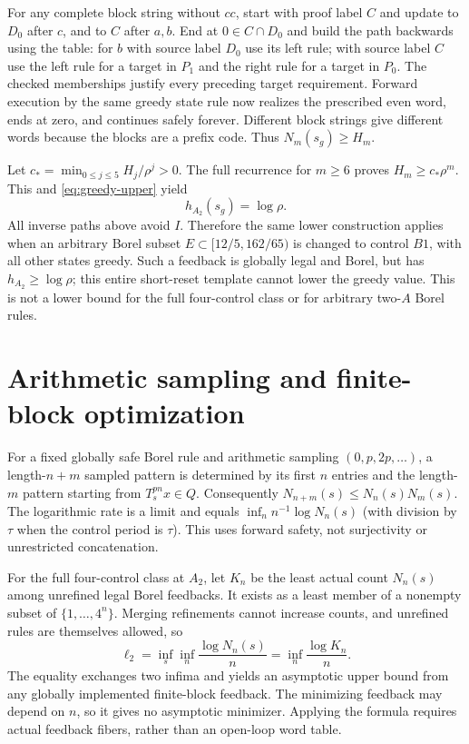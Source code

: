 \documentclass[11pt,reqno]{amsart}
\numberwithin{equation}{section}
\theoremstyle{definition}
\begin{document}
For any complete block string without $cc$, start with proof label
$C$ and update to $D_0$ after $c$, and to $C$ after $a,b$.
End at $0\in C\cap D_0$ and build the path backwards using
the table: for $b$ with source label $D_0$ use its left rule;
with source label $C$ use the left rule for a target in $P_1$
and the right rule for a target in $P_0$. The checked memberships
justify every preceding target requirement. Forward execution by
the same greedy state rule now realizes the prescribed even word,
ends at zero, and continues safely forever. Different block strings
give different words because the blocks are a prefix code. Thus
$N_m(s_g)\ge H_m$.

Let $c_* =\min_{0\le j\le5}H_j/\rho^j>0$. The full recurrence
for $m\ge6$ proves $H_m\ge c_*\rho^m$. This and
\eqref{eq:greedy-upper} yield
\begin{equation}\label{eq:greedy-exact}
 h_{A_2}(s_g)=\log\rho.
\end{equation}
All inverse paths above avoid $I$. Therefore the same lower
construction applies when an arbitrary Borel subset
$E\subset[12/5,162/65)$ is changed to control $B1$, with all
other states greedy. Such a feedback is globally legal and Borel,
but has $h_{A_2}\ge\log\rho$; this entire short-reset template
cannot lower the greedy value. This is not a lower bound for the
full four-control class or for arbitrary two-$A$ Borel rules.

\section{Arithmetic sampling and finite-block optimization}
\label{app:finiteblock}
For a fixed globally safe Borel rule and arithmetic sampling
$(0,p,2p,\ldots)$, a length-$n+m$ sampled pattern is determined
by its first $n$ entries and the length-$m$ pattern starting from
$T_s^{pn}x\in Q$. Consequently $N_{n+m}(s)\le N_n(s)N_m(s)$.
The logarithmic rate is a limit and equals
$\inf_n n^{-1}\log N_n(s)$ (with division by $\tau$ when
the control period is $\tau$). This uses forward safety, not
surjectivity or unrestricted concatenation.

For the full four-control class at $A_2$, let $K_n$ be the least
actual count $N_n(s)$ among unrefined legal Borel feedbacks.
It exists as a least member of a nonempty subset of
$\{1,\ldots,4^n\}$. Merging refinements cannot increase counts,
and unrefined rules are themselves allowed, so
\begin{equation}\label{eq:finiteblock}
 \ell_2=\inf_s\inf_n\frac{\log N_n(s)}n
 =\inf_n\frac{\log K_n}n.
\end{equation}
The equality exchanges two infima and yields an asymptotic upper
bound from any globally implemented finite-block feedback. The
minimizing feedback may depend on $n$, so it gives no asymptotic
minimizer. Applying the formula requires actual feedback fibers,
rather than an open-loop word table.
\end{document}
